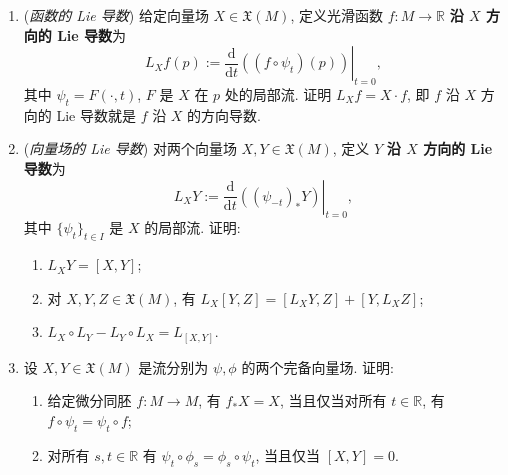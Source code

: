 \begin{RiemannExercise}
\begin{enumerate}[label=(\arabic*),ref=\arabic*,leftmargin=*]
\begin{enumerate}[label=(\alph*),leftmargin=*]
\item 若向量场 $Y$ 关于 $f$ 与 $X$ 相关, 则 $f$ 把 $X$ 的任一条积分曲线映为 $Y$ 的一条积分曲线;
\item 向量场 $Y$ 关于 $f$ 与 $X$ 相关, 当且仅当对所有使两边都有定义的 $(t,p)$, 局部流 $F_X,F_Y$ 满足 $f(F_X(p,t))=F_Y(f(p),t)$.
\end{enumerate}
\item\label{ex:lie-derivative-of-function} (\emph{函数的 Lie 导数}) 给定向量场 $X\in\mathfrak{X}(M)$, 定义光滑函数 $f:M\to\mathbb{R}$ \textbf{沿 $X$ 方向的 Lie 导数}为
\[
  L_X f(p):=\left.\frac{\mathrm{d}}{\mathrm{d}t}((f\circ\psi_t)(p))\right|_{t=0},
\]
其中 $\psi_t=F(\cdot,t)$, $F$ 是 $X$ 在 $p$ 处的局部流. 证明 $L_X f=X\cdot f$, 即 $f$ 沿 $X$ 方向的 Lie 导数就是 $f$ 沿 $X$ 的方向导数.
\item\label{ex:lie-derivative-of-vector-field} (\emph{向量场的 Lie 导数}) 对两个向量场 $X,Y\in\mathfrak{X}(M)$, 定义 $Y$ \textbf{沿 $X$ 方向的 Lie 导数}为
\[
  L_XY:=\left.\frac{\mathrm{d}}{\mathrm{d}t}((\psi_{-t})_*Y)\right|_{t=0},
\]
其中 $\{\psi_t\}_{t\in I}$ 是 $X$ 的局部流. 证明:
\begin{enumerate}[label=(\alph*),leftmargin=*]
\item $L_XY=[X,Y]$;
\item 对 $X,Y,Z\in\mathfrak{X}(M)$, 有 $L_X[Y,Z]=[L_XY,Z]+[Y,L_XZ]$;
\item $L_X\circ L_Y-L_Y\circ L_X=L_{[X,Y]}$.
\end{enumerate}
\item\label{ex:commuting-flows-and-pushforward} 设 $X,Y\in\mathfrak{X}(M)$ 是流分别为 $\psi,\phi$ 的两个完备向量场. 证明:
\begin{enumerate}[label=(\alph*),leftmargin=*]
\item 给定微分同胚 $f:M\to M$, 有 $f_*X=X$, 当且仅当对所有 $t\in\mathbb{R}$, 有 $f\circ\psi_t=\psi_t\circ f$;
\item 对所有 $s,t\in\mathbb{R}$ 有 $\psi_t\circ\phi_s=\phi_s\circ\psi_t$, 当且仅当 $[X,Y]=0$.
\end{enumerate}
\end{enumerate}
\end{RiemannExercise}
